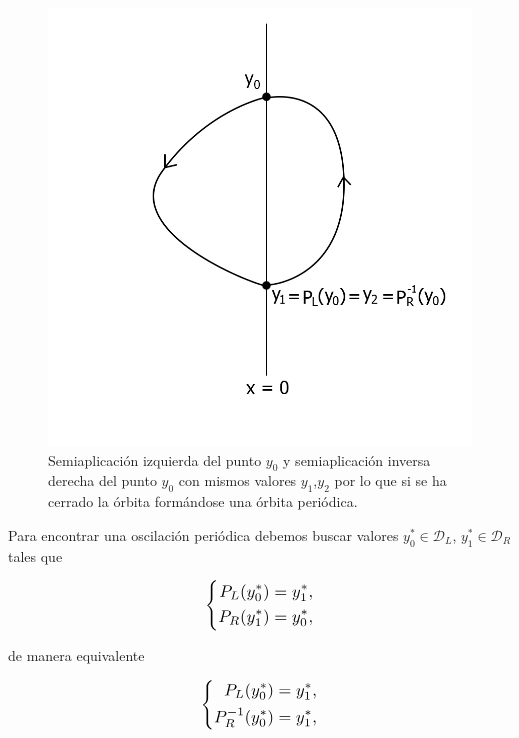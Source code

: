 \documentclass[12pt,a4paper]{report} %
\begin{document}
	\begin{figure}[h]
		\centering
		\includegraphics[width=1.1\textwidth,center]{aplipoincareL-Rcerrado.jpg}
		\caption{Semiaplicación izquierda del punto $y_0$ y semiaplicación inversa derecha del punto $y_0$ con mismos valores $y_1$,$y_2$ por lo que si se ha cerrado la órbita formándose una órbita periódica.}
		\label{fig:aplipoincareL-Rcerrado}
	\end{figure}\smallskip
	
	\newpage
	
	\vspace{0.5cm}\noindent Para encontrar una oscilación periódica debemos buscar valores $y_0^*\in \mathcal{D}_L$, $y_1^*\in \mathcal{D}_R$ tales que
	
	\begin{equation*}
		\label{eq:ej1}
		\scalebox{1.2}{$\displaystyle
			\left\{
			\begin{aligned}
				P_L(y_0^*)=y_1^*, \\
				P_R(y_1^*)=y_0^* ,
			\end{aligned}
			\right. 
			$}
	\end{equation*}\smallskip
	
	\noindent de manera equivalente
	
	\begin{equation*}
		\label{eq:ej2}
		\scalebox{1.2}{$\displaystyle
			\left\{
			\begin{aligned}
				P_L(y_0^*)=y_1^*, \\
				P_R^{-1}(y_0^*)=y_1^*,
			\end{aligned}
			\right. 
			$}
	\end{equation*}\smallskip
	
\end{document}
